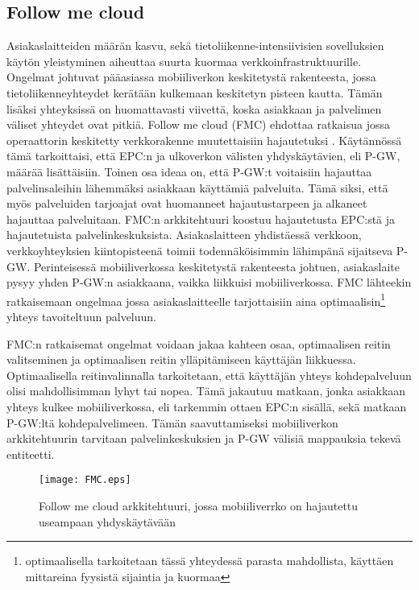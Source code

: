 \subsection{Follow me cloud} \label{fmc}

Asiakaslaitteiden määrän kasvu, sekä tietoliikenne-intensiivisien sovelluksien käytön yleistyminen aiheuttaa suurta kuormaa verkkoinfrastruktuurille. Ongelmat johtuvat pääasiassa mobiiliverkon keskitetystä rakenteesta, jossa tietoliikenneyhteydet kerätään kulkemaan keskitetyn pisteen kautta. Tämän lisäksi yhteyksissä on huomattavasti viivettä, koska asiakkaan ja palvelimen väliset yhteydet ovat pitkiä. Follow me cloud (FMC) ehdottaa ratkaisua jossa operaattorin keskitetty verkkorakenne muutettaisiin hajautetuksi \cite{taleb2013follow}.
Käytännössä tämä tarkoittaisi, että EPC:n ja ulkoverkon välisten yhdyskäytävien, eli P-GW, määrää lisättäisiin. 
Toinen osa ideaa on, että P-GW:t voitaisiin hajauttaa palvelinsaleihin lähemmäksi asiakkaan käyttämiä palveluita. Tämä siksi, että myös palveluiden tarjoajat ovat huomanneet hajautustarpeen ja alkaneet hajauttaa palveluitaan. 
FMC:n arkkitehtuuri koostuu hajautetusta EPC:stä ja hajautetuista palvelinkeskuksista. Asiakaslaitteen yhdistäessä verkkoon, verkkoyhteyksien kiintopisteenä toimii todennäköisimmin lähimpänä sijaitseva P-GW. 
Perinteisessä mobiiliverkossa keskitetystä rakenteesta johtuen, asiakaslaite pysyy yhden P-GW:n asiakkaana, vaikka liikkuisi mobiiliverkossa.
FMC lähteekin ratkaisemaan ongelmaa jossa asiakaslaitteelle tarjottaisiin aina optimaalisin\footnote{optimaalisella tarkoitetaan tässä yhteydessä parasta mahdollista, käyttäen mittareina fyysistä sijaintia ja kuormaa} yhteys tavoiteltuun palveluun.

FMC:n ratkaisemat ongelmat voidaan jakaa kahteen osaa, optimaalisen reitin valitseminen ja optimaalisen reitin ylläpitämiseen käyttäjän liikkuessa. 
Optimaalisella reitinvalinnalla tarkoitetaan, että käyttäjän yhteys kohdepalveluun olisi mahdollisimman lyhyt tai nopea. Tämä jakautuu matkaan, jonka asiakkaan yhteys kulkee mobiiliverkossa, eli tarkemmin ottaen EPC:n sisällä, sekä matkaan P-GW:ltä kohdepalvelimeen. Tämän saavuttamiseksi mobiiliverkon arkkitehtuurin tarvitaan palvelinkeskuksien ja P-GW välisiä mappauksia tekevä entiteetti. 

\begin{figure}[tb]
\texttt{[image: FMC.eps]}
\caption{Follow me cloud arkkitehtuuri, jossa mobiiliverrko on hajautettu useampaan yhdyskäytävään} \label{fig:fmc}
\end{figure}

